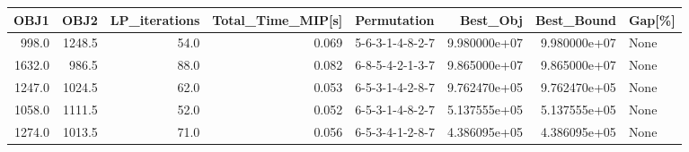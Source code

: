 \begin{tabular}{rrrrlrrl}
\toprule
   OBJ1 &    OBJ2 &  LP\_iterations &  Total\_Time\_MIP[s] &      Permutation &      Best\_Obj &    Best\_Bound & Gap[\%] \\
\midrule
  998.0 &  1248.5 &           54.0 &              0.069 &  5-6-3-1-4-8-2-7 &  9.980000e+07 &  9.980000e+07 &   None \\
 1632.0 &   986.5 &           88.0 &              0.082 &  6-8-5-4-2-1-3-7 &  9.865000e+07 &  9.865000e+07 &   None \\
 1247.0 &  1024.5 &           62.0 &              0.053 &  6-5-3-1-4-2-8-7 &  9.762470e+05 &  9.762470e+05 &   None \\
 1058.0 &  1111.5 &           52.0 &              0.052 &  6-5-3-1-4-8-2-7 &  5.137555e+05 &  5.137555e+05 &   None \\
 1274.0 &  1013.5 &           71.0 &              0.056 &  6-5-3-4-1-2-8-7 &  4.386095e+05 &  4.386095e+05 &   None \\
\bottomrule
\end{tabular}
